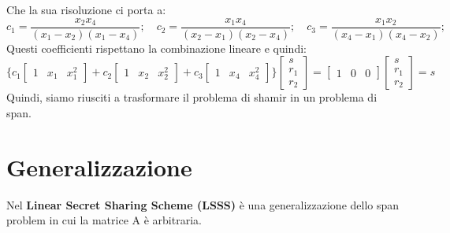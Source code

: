 \documentclass{book}
\begin{document}
Che la sua risoluzione ci porta a:\begin{equation*}
    c_{1}=\frac{x_{2}x_{4}}{(x_{1}-x_{2})(x_{1}-x_{4})};\quad  c_{2}=\frac{x_{1}x_{4}}{(x_{2}-x_{1})(x_{2}-x_{4})};\quad c_{3}=\frac{x_{1}x_{2}}{(x_{4}-x_{1})(x_{4}-x_{2})};
\end{equation*}
Questi coefficienti rispettano la combinazione lineare e quindi:\begin{equation*}
    \{c_{1}\begin{bmatrix}
		1 & x_{1} & x_{1}^2
	\end{bmatrix}+c_{2}\begin{bmatrix}
		1 & x_{2} & x_{2}^{2}
	\end{bmatrix}+c_{3}\begin{bmatrix}
		1 & x_{4} & x_{4}^{2}
	\end{bmatrix}\}\begin{bmatrix}
        s\\r_{1}\\r_{2}
    \end{bmatrix}=\begin{bmatrix}
        1&0&0
    \end{bmatrix}\begin{bmatrix}
        s\\r_{1}\\r_{2}
    \end{bmatrix}=s
\end{equation*}
Quindi, siamo riusciti a trasformare il problema di shamir in un problema di span.
\section{Generalizzazione}
Nel \textbf{Linear Secret Sharing Scheme (LSSS)} è una generalizzazione dello span problem in cui la matrice A è arbitraria.
\end{document}
